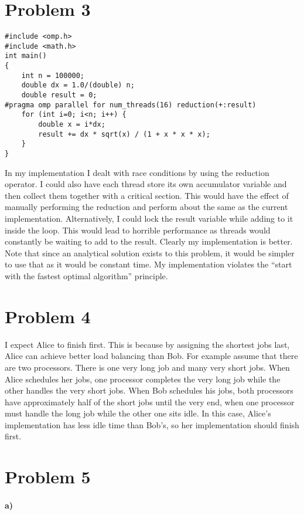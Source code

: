 \documentclass[12pt]{article}
\begin{document}
\section*{Problem 3}

\begin{verbatim}
#include <omp.h>
#include <math.h>
int main()
{
    int n = 100000;
    double dx = 1.0/(double) n;
    double result = 0;
#pragma omp parallel for num_threads(16) reduction(+:result)
    for (int i=0; i<n; i++) {
        double x = i*dx;
        result += dx * sqrt(x) / (1 + x * x * x);
    }
}
\end{verbatim}
In my implementation I dealt with race conditions by using the reduction operator. I could also have
each thread store its own accumulator variable and then collect them together with a critical section.
This would have the effect of manually performing the reduction and perform about the same as the current
implementation. Alternatively, I could lock the result variable while adding to it inside the loop. This
would lead to horrible performance as threads would constantly be waiting to add to the result. Clearly my
implementation is better. Note that since an analytical solution exists to this problem, it would be simpler
to use that as it would be constant time. My implementation violates the ``start with the fastest optimal
algorithm'' principle.

\section*{Problem 4}

I expect Alice to finish first. This is because by assigning the shortest jobs last, Alice can achieve better
load balancing than Bob. For example assume that there are two processors. There is one very long job and
many very short jobs. When Alice schedules her jobs, one processor completes the very long job while the other
handles the very short jobs. When Bob schedules his jobs, both processors have approximately half of the short jobs
until the very end, when one processor must handle the long job while the other one sits idle. In this case, Alice's
implementation has less idle time than Bob's, so her implementation should finish first.

\section*{Problem 5}

\paragraph{a)}
\end{document}

